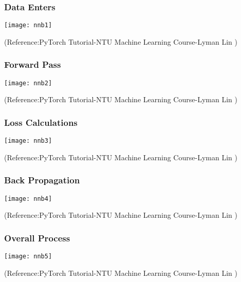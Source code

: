 \begin{frame}[fragile] \frametitle{Data Enters }
\begin{center}
\texttt{[image: nnb1]}
\end{center}
\tiny{(Reference:PyTorch Tutorial-NTU Machine Learning Course-Lyman Lin )}
\end{frame}

\begin{frame}[fragile] \frametitle{Forward Pass}
\begin{center}
\texttt{[image: nnb2]}
\end{center}
\tiny{(Reference:PyTorch Tutorial-NTU Machine Learning Course-Lyman Lin )}
\end{frame}
\begin{frame}[fragile] \frametitle{Loss Calculations}
\begin{center}
\texttt{[image: nnb3]}
\end{center}
\tiny{(Reference:PyTorch Tutorial-NTU Machine Learning Course-Lyman Lin )}
\end{frame}
\begin{frame}[fragile] \frametitle{Back Propagation}
\begin{center}
\texttt{[image: nnb4]}
\end{center}
\tiny{(Reference:PyTorch Tutorial-NTU Machine Learning Course-Lyman Lin )}
\end{frame}
\begin{frame}[fragile] \frametitle{Overall Process}
\begin{center}
\texttt{[image: nnb5]}
\end{center}
\tiny{(Reference:PyTorch Tutorial-NTU Machine Learning Course-Lyman Lin )}
\end{frame}



